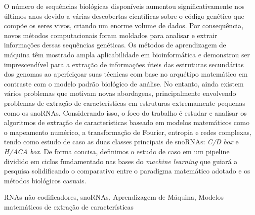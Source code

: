 O número de sequências biológicas disponíveis aumentou significativamente nos últimos anos devido a várias descobertas científicas sobre o código genético que compõe os seres vivos, criando um enorme volume de dados. Por consequência, novos métodos computacionais foram moldados para analisar e extrair informações dessas sequências genéticas. Os métodos de aprendizagem de máquina têm mostrado ampla aplicabilidade em bioinformática e demonstrou ser imprescendível para a extração de informações úteis das estruturas secundárias dos genomas ao aperfeiçoar suas técnicas com base no arquétipo matemático em contraste com o modelo padrão biológico de análise. No entanto, ainda existem vários problemas que motivam novas abordagens, principalmente envolvendo problemas de extração de características em estruturas extremamente pequenas como os snoRNAs. Considerando isso, o foco do trabalho é estudar e analisar os algoritmos de extração de características baseado em modelos matemáticos como o mapeamento numérico, a transformação de Fourier, entropia e redes complexas, tendo como estudo de caso as duas classes principais de snoRNAs: \textit{C/D box} e \textit{H/ACA box}. De forma concisa, definimos o estudo de caso em um pipeline dividido em ciclos fundamentado nas bases do \textit{machine learning} que guiará a pesquisa solidificando o comparativo entre o paradigma matemático adotado e os métodos biológicos casuais. 

\begin{keywords}
RNAs não codificadores, snoRNAs, Aprendizagem de Máquina, Modelos matemáticos de extração de características
\end{keywords}